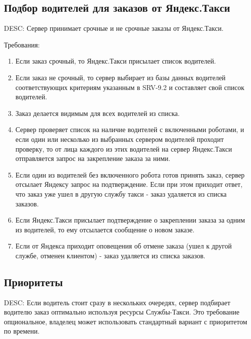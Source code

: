 	\subsection{Подбор водителей для заказов от Яндекс.Такси}

		DESC: Сервер принимает срочные и не срочные заказы от Яндекс.Такси.

		Требования:

		\begin{enumerate}
			\item{Если заказ срочный, то Яндекс.Такси присылает список водителей.}

			\item{Если заказ не срочный, то сервер выбирает из базы данных водителей соответствующих критериям указанным в SRV-9.2 и составляет свой список водителей.}

			\item{Заказ делается видимым для всех водителей из списка.}

			\item{Сервер проверяет список на наличие водителей с включенными роботами, и если один или несколько из выбранных сервером водителей проходит проверку, то от лица каждого из этих водителей на сервер Яндекс.Такси отправляется запрос на закрепление заказа за ними.}

			\item{Если один из водителей без включенного робота готов принять заказ, сервер отсылает Яндексу запрос на подтверждение. Если при этом приходит ответ, что заказ уже ушел в другую службу такси - заказ удаляется из списка заказов.}

			\item{Если Яндекс.Такси присылает подтверждение о закреплении заказа за одним из водителей, то ему отсылается сообщение о новом заказе.}

			\item{Если от Яндекса приходит оповещения об отмене заказа (ушел к другой службе, отменен клиентом) - заказ удаляется из списка заказов.}
		\end{enumerate}

	\subsection{Приоритеты}

		DESC: Если водитель стоит сразу в нескольких очередях, сервер подбирает водителю заказ оптимально используя ресурсы Службы-Такси. Это требование опциональное, владелец может использовать стандартный вариант с приоритетом по времени.

